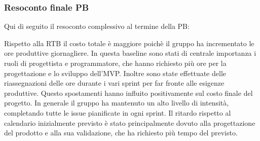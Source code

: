 \subsubsection{Resoconto finale PB}
Qui di seguito il resoconto complessivo al termine della PB:



\noindent Rispetto alla RTB il costo totale è maggiore poichè il gruppo ha incrementato le ore produttive giornagliere.
In questa baseline sono stati di centrale importanza i ruoli di progettista e programmatore, che hanno richiesto più ore per la progettazione e lo sviluppo dell'MVP.
Inoltre sono state effettuate delle riassegnazioni delle ore durante i vari sprint per far fronte alle esigenze produttive. Questo spostamenti hanno influito positivamente sul costo finale del progetto.
In generale il gruppo ha mantenuto un alto livello di intensità, completando tutte le issue pianificate in ogni sprint. 
Il ritardo rispetto al calendario inizialmente previsto è stato principalmente dovuto alla progettazione del prodotto e alla sua validazione, che ha richiesto più tempo del previsto.
